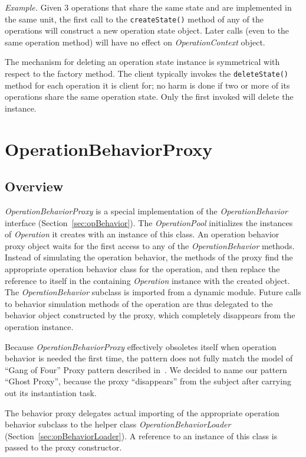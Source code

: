 \documentclass[a4paper,twoside]{tce}
\begin{document}
\emph{Example.} Given 3 operations that share the same state and are
implemented in the same unit, the first call to the \verb#createState()#
method of any of the operations will construct a new operation state object.
Later calls (even to the same operation method) will have no effect on
\emph{OperationContext} object.

The mechanism for deleting an operation state instance is symmetrical with
respect to the factory method.  The client typically invokes the
\verb|deleteState()| method for each operation it is client for; no harm is
done if two or more of its operations share the same operation state.  Only
the first invoked will delete the instance.


\section{OperationBehaviorProxy}
\label{sec:opBehaviorProxy}

\subsection{Overview}

\emph{OperationBehaviorProxy} is a special implementation of the
\emph{OperationBehavior} interface (Section~\ref{sec:opBehavior}).  The
\emph{OperationPool} initializes the instances of \emph{Operation} it
creates with an instance of this class.  An operation behavior proxy object
waits for the first access to any of the \emph{OperationBehavior} methods.
Instead of simulating the operation behavior, the methods of the proxy find
the appropriate operation behavior class for the operation, and then
replace the reference to itself in the containing \emph{Operation} instance
with the created object.  The \emph{OperationBehavior} subclass is imported
from a dynamic module.  Future calls to behavior simulation methods of the
operation are thus delegated to the behavior object constructed by the
proxy, which completely disappears from the operation instance.

Because \emph{OperationBehaviorProxy} effectively obsoletes itself when
operation behavior is needed the first time, the pattern does not fully
match the model of ``Gang of Four'' Proxy pattern described
in~\cite{DesignPatterns}.  We decided to name our pattern ``Ghost Proxy'',
because the proxy ``disappears'' from the subject after carrying out its
instantiation task.

The behavior proxy delegates actual importing of the appropriate operation
behavior subclass to the helper class \emph{OperationBehaviorLoader}
(Section~\ref{sec:opBehaviorLoader}).  A reference to an instance of this
class is passed to the proxy constructor.
\end{document}
